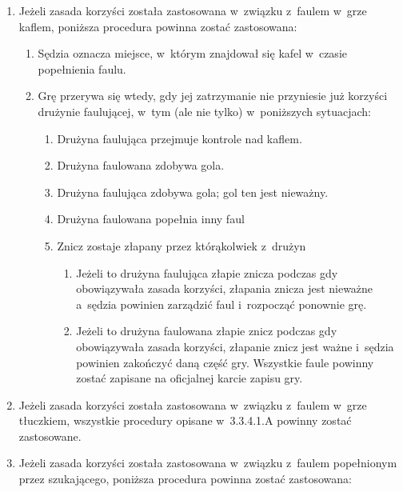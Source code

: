 \documentclass[12pt]{article}
\begin{document}
\begin{enumerate}
	\item
	      Jeżeli zasada korzyści została zastosowana w~związku z~faulem w~grze
	      kaflem, poniższa procedura powinna zostać zastosowana:

	      \begin{enumerate}
		      \item
		            Sędzia oznacza miejsce, w~którym znajdował się kafel w~czasie
		            popełnienia faulu.
		      \item
		            Grę przerywa się wtedy, gdy jej zatrzymanie nie przyniesie już
		            korzyści drużynie faulującej, w~tym (ale nie tylko) w~poniższych
		            sytuacjach:

		            \begin{enumerate}
			            \item
			                  Drużyna faulująca przejmuje kontrole nad kaflem.
			            \item
			                  Drużyna faulowana zdobywa gola.
			            \item
			                  Drużyna faulująca zdobywa gola; gol ten jest nieważny.
			            \item
			                  Drużyna faulowana popełnia inny faul
			            \item
			                  Znicz zostaje złapany przez którąkolwiek z~drużyn

			                  \begin{enumerate}
				                  \item
				                        Jeżeli to drużyna faulująca złapie znicza podczas gdy
				                        obowiązywała zasada korzyści, złapania znicza jest nieważne a~sędzia powinien zarządzić faul i~rozpocząć ponownie grę.
				                  \item
				                        Jeżeli to drużyna faulowana złapie znicz podczas gdy
				                        obowiązywała zasada korzyści, złapanie znicz jest ważne i~sędzia
				                        powinien zakończyć daną część gry. Wszystkie faule powinny
				                        zostać zapisane na oficjalnej karcie zapisu gry.
			                  \end{enumerate}
		            \end{enumerate}
	      \end{enumerate}
	\item
	      Jeżeli zasada korzyści została zastosowana w~związku z~faulem w~grze
	      tłuczkiem, wszystkie procedury opisane w~3.3.4.1.A powinny zostać
	      zastosowane.
	\item
	      Jeżeli zasada korzyści została zastosowana w~związku z~faulem
	      popełnionym przez szukającego, poniższa procedura powinna zostać
	      zastosowana:


\end{enumerate}
\end{document}

